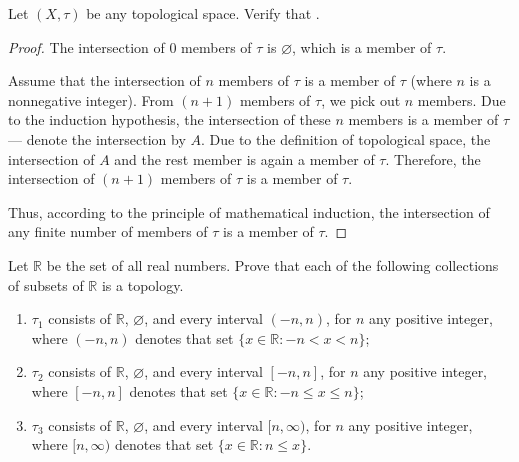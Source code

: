 \begin{exercise}
	Let $(X, \tau)$ be any topological space. Verify that \color{blue}{the intersection of any finite number of members of $\tau$ is a member of $\tau$}.
\end{exercise}

\begin{proof}
	The intersection of $0$ members of $\tau$ is $\varnothing$, which is a member of $\tau$.

	Assume that the intersection of $n$ members of $\tau$ is a member of $\tau$ (where $n$ is a nonnegative integer). From $(n+1)$ members of $\tau$, we pick out $n$ members. Due to the induction hypothesis, the intersection of these $n$ members is a member of $\tau$ --- denote the intersection by $A$. Due to the definition of topological space, the intersection of $A$ and the rest member is again a member of $\tau$. Therefore, the intersection of $(n+1)$ members of $\tau$ is a member of $\tau$.

	Thus, according to the principle of mathematical induction, the intersection of any finite number of members of $\tau$ is a member of $\tau$.
\end{proof}
\newpage

\begin{exercise}
	Let $\mathbb{R}$ be the set of all real numbers. Prove that each of the following collections of subsets of $\mathbb{R}$ is a topology.
	\begin{enumerate}[label={(\roman*)}]
		\item $\tau_{1}$ consists of $\mathbb{R}$, $\varnothing$, and every interval $(-n, n)$, for $n$ any positive integer, where $(-n, n)$ denotes that set $\{ x\in\mathbb{R} : -n < x < n \}$;
		\item $\tau_{2}$ consists of $\mathbb{R}$, $\varnothing$, and every interval $[-n, n]$, for $n$ any positive integer, where $[-n, n]$ denotes that set $\{ x\in\mathbb{R} : -n \leq x \leq n \}$;
		\item $\tau_{3}$ consists of $\mathbb{R}$, $\varnothing$, and every interval $[n, \infty)$, for $n$ any positive integer, where $[n, \infty)$ denotes that set $\{ x\in\mathbb{R} : n\leq x \}$.
	\end{enumerate}
\end{exercise}

